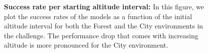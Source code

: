 \begin{figure}[t]
\begin{small}
\begin{subfigure}{0.47\linewidth}
\end{subfigure}
\end{small}
\centering
{}

\caption{\textbf{Success rate per starting altitude interval:} In this figure, we plot the success rates of the models as a function of the initial altitude interval for both the Forest and the City environments in the \challenge{} challenge. The performance drop that comes with increasing altitude is more pronounced for the City environment.}
    \label{fig:by_altitude}
\end{figure}
